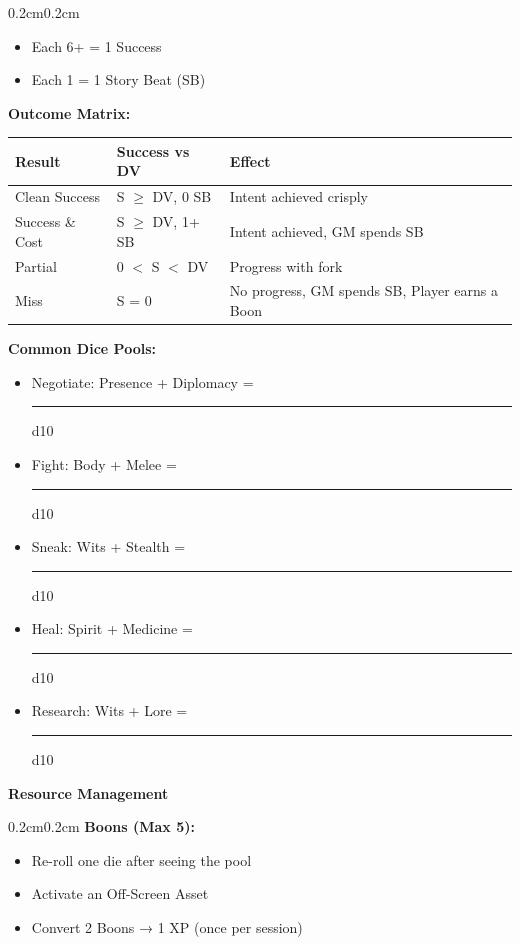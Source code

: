 \documentclass[10pt]{article}
\newcommand{\boon}{\textcolor{orange}{\ding{72}}}
\begin{document}
\begin{mdframed}[backgroundcolor=background, linewidth=0pt]
\begin{adjustwidth}{0.2cm}{0.2cm}
\begin{itemize}[leftmargin=*]
\item Each 6+ = 1 Success
\item Each 1 = 1 Story Beat (SB)
\end{itemize}

\textbf{Outcome Matrix:}
\begin{center}
\begin{tabular}{|l|l|l|}
\hline
\cellcolor{lightaccent} \textbf{Result} & \cellcolor{lightaccent} \textbf{Success vs DV} & \cellcolor{lightaccent} \textbf{Effect} \\
\hline
Clean Success & S $\geq$ DV, 0 SB & Intent achieved crisply \\
Success \& Cost & S $\geq$ DV, 1+ SB & Intent achieved, GM spends SB \\
Partial & 0 $<$ S $<$ DV & Progress with fork \\
Miss & S = 0 & No progress, GM spends SB, Player earns a Boon \\
\hline
\end{tabular}
\end{center}

\textbf{Common Dice Pools:}
\begin{itemize}[leftmargin=*]
\item Negotiate: Presence + Diplomacy = \rule{2cm}{0.4pt} d10
\item Fight: Body + Melee = \rule{2cm}{0.4pt} d10
\item Sneak: Wits + Stealth = \rule{2cm}{0.4pt} d10
\item Heal: Spirit + Medicine = \rule{2cm}{0.4pt} d10
\item Research: Wits + Lore = \rule{2cm}{0.4pt} d10
\end{itemize}
\end{adjustwidth}

\vspace{0.3cm}

\begin{mdframed}[backgroundcolor=sectionbg, linewidth=1pt, linecolor=accentcolor]
\textbf{\large Resource Management}
\end{mdframed}

\begin{adjustwidth}{0.2cm}{0.2cm}
\vspace{0.2cm}
\textbf{Boons (Max 5):}
\begin{itemize}[leftmargin=*]
\item \boon Re-roll one die after seeing the pool
\item \boon Activate an Off-Screen Asset
\item \boon Convert 2 Boons → 1 XP (once per session)
\end{itemize}


\end{adjustwidth}
\end{mdframed}
\end{document}
